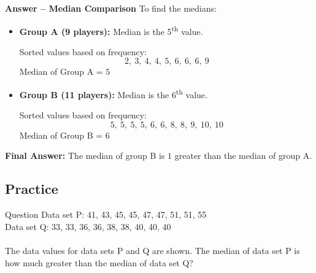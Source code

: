 \documentclass{beamer}
\begin{document}
\begin{frame}{\textbf{Answer – Median Comparison}}
To find the medians:

\begin{itemize}
    \item \textbf{Group A (9 players):} Median is the 5\textsuperscript{th} value.
    
    Sorted values based on frequency:
    \[
    2,\ 3,\ 4,\ 4,\ \boxed{5},\ 6,\ 6,\ 6,\ 9
    \]
    Median of Group A = \( \boxed{5} \)
    
    \item \textbf{Group B (11 players):} Median is the 6\textsuperscript{th} value.
    
    Sorted values based on frequency:
    \[
    5,\ 5,\ 5,\ 5,\ 6,\ \boxed{6},\ 8,\ 8,\ 9,\ 10,\ 10
    \]
    Median of Group B = \( \boxed{6} \)
\end{itemize}

\textbf{Final Answer:} The median of group B is \( \boxed{1} \) greater than the median of group A.
\end{frame}


\begin{frame}
\section{Practice}
\end{frame}


\begin{frame}{Question}
Data set P: 41, 43, 45, 45, 47, 47, 51, 51, 55 \\
Data set Q: 33, 33, 36, 36, 38, 38, 40, 40, 40 \\
\\
The data values for data sets P and Q are shown. The median of data set P is how much greater than the median of data set Q?
\end{frame}
\end{document}
